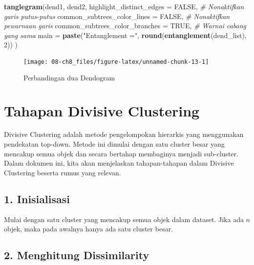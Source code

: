 \documentclass[
  oneside]{book}
\newenvironment{Shaded}{\begin{snugshade}}{\end{snugshade}}
\newcommand{\AttributeTok}[1]{\textcolor[rgb]{0.13,0.29,0.53}{#1}}
\newcommand{\CommentTok}[1]{\textcolor[rgb]{0.56,0.35,0.01}{\textit{#1}}}
\newcommand{\ConstantTok}[1]{\textcolor[rgb]{0.56,0.35,0.01}{#1}}
\newcommand{\DecValTok}[1]{\textcolor[rgb]{0.00,0.00,0.81}{#1}}
\newcommand{\FunctionTok}[1]{\textcolor[rgb]{0.13,0.29,0.53}{\textbf{#1}}}
\newcommand{\NormalTok}[1]{#1}
\newcommand{\StringTok}[1]{\textcolor[rgb]{0.31,0.60,0.02}{#1}}
\begin{document}
\begin{Shaded}
\begin{Highlighting}[]
\FunctionTok{tanglegram}\NormalTok{(dend1, dend2,}
           \AttributeTok{highlight\_distinct\_edges =} \ConstantTok{FALSE}\NormalTok{, }\CommentTok{\# Nonaktifkan garis putus{-}putus}
           \AttributeTok{common\_subtrees\_color\_lines =} \ConstantTok{FALSE}\NormalTok{, }\CommentTok{\# Nonaktifkan pewarnaan garis}
           \AttributeTok{common\_subtrees\_color\_branches =} \ConstantTok{TRUE}\NormalTok{, }\CommentTok{\# Warnai cabang yang sama}
           \AttributeTok{main =} \FunctionTok{paste}\NormalTok{(}\StringTok{"Entanglement ="}\NormalTok{, }\FunctionTok{round}\NormalTok{(}\FunctionTok{entanglement}\NormalTok{(dend\_list), }\DecValTok{2}\NormalTok{))}
\NormalTok{)}
\end{Highlighting}
\end{Shaded}

\begin{figure}[h]

{\centering \texttt{[image: 08-ch8\_files/figure-latex/unnamed-chunk-13-1]} 

}

\caption{Perbandingan dua Dendogram}\label{fig:unnamed-chunk-13}
\end{figure}

\section{Tahapan Divisive Clustering}\label{tahapan-divisive-clustering}

Divisive Clustering adalah metode pengelompokan hierarkis yang menggunakan pendekatan top-down. Metode ini dimulai dengan satu cluster besar yang mencakup semua objek dan secara bertahap membaginya menjadi sub-cluster. Dalam dokumen ini, kita akan menjelaskan tahapan-tahapan dalam Divisive Clustering beserta rumus yang relevan.

\subsection*{1. Inisialisasi}\label{inisialisasi-3}

Mulai dengan satu cluster yang mencakup semua objek dalam dataset. Jika ada \(n\) objek, maka pada awalnya hanya ada satu cluster besar.

\subsection*{2. Menghitung Dissimilarity}\label{menghitung-dissimilarity}
\end{document}
